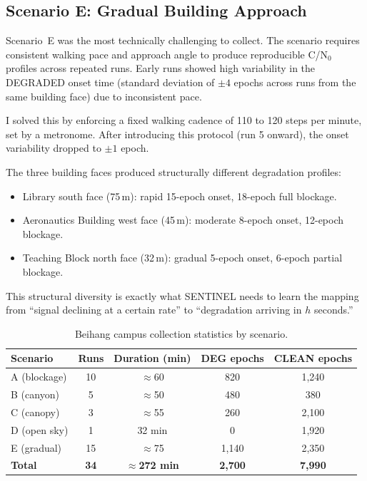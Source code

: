 \documentclass[12pt,a4paper]{article}
\begin{document}
\subsection{Scenario E: Gradual Building Approach}

Scenario~E was the most technically challenging to collect.
The scenario requires consistent walking pace and approach angle to produce reproducible
C/N$_0$ profiles across repeated runs.
Early runs showed high variability in the DEGRADED onset time (standard deviation of
$\pm 4$ epochs across runs from the same building face) due to inconsistent pace.

I solved this by enforcing a fixed walking cadence of 110 to 120 steps per minute,
set by a metronome.
After introducing this protocol (run 5 onward), the onset variability dropped to
$\pm 1$ epoch.

The three building faces produced structurally different degradation profiles:
\begin{itemize}
  \item Library south face (75\,m): rapid 15-epoch onset, 18-epoch full blockage.
  \item Aeronautics Building west face (45\,m): moderate 8-epoch onset, 12-epoch blockage.
  \item Teaching Block north face (32\,m): gradual 5-epoch onset, 6-epoch partial blockage.
\end{itemize}
This structural diversity is exactly what SENTINEL needs to learn the mapping from
``signal declining at a certain rate'' to ``degradation arriving in $h$ seconds.''

\begin{table}[H]
  \centering
  \caption{Beihang campus collection statistics by scenario.}
  \begin{tabular}{lcccc}
    \toprule
    \textbf{Scenario} & \textbf{Runs} & \textbf{Duration (min)} &
    \textbf{DEG epochs} & \textbf{CLEAN epochs} \\
    \midrule
    A (blockage)   & 10 & $\approx$60 & 820  & 1,240\\
    B (canyon)     &  5 & $\approx$50 & 480  & 380\\
    C (canopy)     &  3 & $\approx$55 & 260  & 2,100\\
    D (open sky)   &  1 & 32 min      & 0    & 1,920 \\
    E (gradual)    & 15 & $\approx$75 & 1,140& 2,350\\
    \midrule
    \textbf{Total} & \textbf{34} & \textbf{$\approx$272 min} &
    \textbf{2,700} & \textbf{7,990} \\
    \bottomrule
  \end{tabular}
\end{table}
\end{document}

